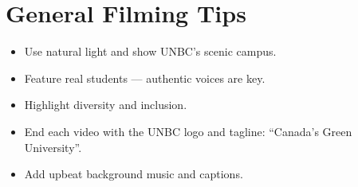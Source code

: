 \documentclass[12pt]{article}
\begin{document}
\section*{General Filming Tips}
\begin{itemize}[leftmargin=*]
    \item Use natural light and show UNBC’s scenic campus.
    \item Feature real students — authentic voices are key.
    \item Highlight diversity and inclusion.
    \item End each video with the UNBC logo and tagline: ``Canada’s Green University''.
    \item Add upbeat background music and captions.
\end{itemize}
\end{document}
